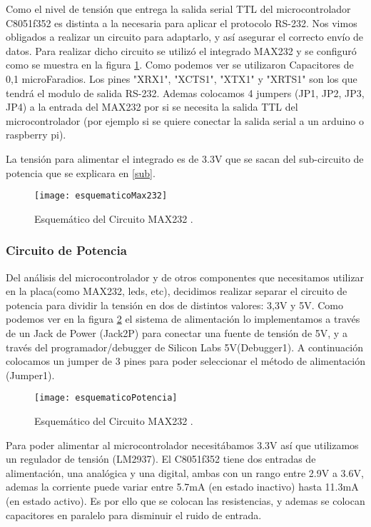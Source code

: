 Como el nivel de tensión que entrega la salida serial TTL del microcontrolador C8051f352 es distinta a la necesaria para aplicar el protocolo RS-232. Nos vimos obligados a realizar un circuito para adaptarlo, y así asegurar el correcto envío de datos. Para realizar dicho circuito se utilizó el integrado MAX232 y se configuró como se muestra en la figura \ref{fig:esquematicoMax232}. Como podemos ver se utilizaron Capacitores de 0,1 microFaradios. Los pines "XRX1", "XCTS1", "XTX1" y "XRTS1" son los que tendrá el modulo de salida RS-232.
Ademas colocamos 4 jumpers (JP1, JP2, JP3, JP4) a la entrada del MAX232 por si se necesita la salida TTL del microcontrolador (por ejemplo si se quiere conectar la salida serial a un arduino o raspberry pi).

La tensión para alimentar el integrado es de 3.3V que se sacan del sub-circuito de potencia que se explicara en \ref{sub}.

\begin{figure}[h]
  \centering
  \texttt{[image: esquematicoMax232]}
  \caption{Esquemático del Circuito MAX232 .}\label{fig:esquematicoMax232}
\end{figure}


\subsubsection{Circuito de Potencia}
\label{circuito_potencia}

Del análisis del microcontrolador y de otros componentes que necesitamos utilizar en la placa(como MAX232, leds, etc), decidimos realizar separar el circuito de potencia para dividir la tensión en dos de distintos valores: 3,3V y 5V.
Como podemos ver en la figura \ref{fig:esquematicoPotencia} el sistema de alimentación lo implementamos a través de un Jack de Power (Jack2P) para conectar una fuente de tensión de 5V, y a través del programador/debugger de Silicon Labs 5V(Debugger1). A continuación colocamos un jumper de 3 pines para poder seleccionar el método de alimentación (Jumper1).

\begin{figure}
  \centering
  \texttt{[image: esquematicoPotencia]}
  \caption{Esquemático del Circuito MAX232 .}\label{fig:esquematicoPotencia}
\end{figure}

Para poder alimentar al microcontrolador necesitábamos 3.3V así que utilizamos un regulador de tensión (LM2937). El C8051f352 tiene dos entradas de alimentación, una analógica y una digital, ambas con un rango entre 2.9V a 3.6V, ademas la corriente puede variar entre 5.7mA (en estado inactivo) hasta 11.3mA (en estado activo). Es por ello que se colocan las resistencias, y ademas se colocan capacitores en paralelo para disminuir el ruido de entrada.

